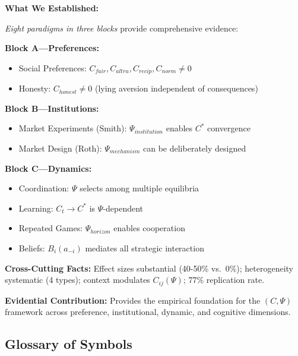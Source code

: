 \begin{tcolorbox}[colback=blue!5!white, colframe=blue!75!black,
    title=\textbf{Summary: Experimental Evidence}]

\textbf{What We Established:}

\textit{Eight paradigms in three blocks} provide comprehensive evidence:

\textbf{Block A---Preferences:}
\begin{itemize}[nosep]
    \item Social Preferences: $C_{fair}, C_{altru}, C_{recip}, C_{norm} \neq 0$
    \item Honesty: $C_{honest} \neq 0$ (lying aversion independent of consequences)
\end{itemize}

\textbf{Block B---Institutions:}
\begin{itemize}[nosep]
    \item Market Experiments (Smith): $\Psi_{institution}$ enables $C^*$ convergence
    \item Market Design (Roth): $\Psi_{mechanism}$ can be deliberately designed
\end{itemize}

\textbf{Block C---Dynamics:}
\begin{itemize}[nosep]
    \item Coordination: $\Psi$ selects among multiple equilibria
    \item Learning: $C_t \to C^*$ is $\Psi$-dependent
    \item Repeated Games: $\Psi_{horizon}$ enables cooperation
    \item Beliefs: $B_i(a_{-i})$ mediates all strategic interaction
\end{itemize}

\textbf{Cross-Cutting Facts:}
Effect sizes substantial (40-50\% vs.\ 0\%); heterogeneity systematic (4 types);
context modulates $C_{ij}(\Psi)$; 77\% replication rate.

\textbf{Evidential Contribution:}
Provides the empirical foundation for the $(C, \Psi)$ framework across
preference, institutional, dynamic, and cognitive dimensions.

\end{tcolorbox}


\subsection{Glossary of Symbols}
\label{sec:EV-glossary}

